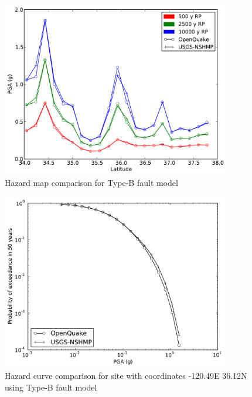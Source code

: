 \begin{figure}
\centering
\includegraphics[width=10cm]{./qareport/pictures/oq_nshmp_bFault_ar1.pdf}
\caption{Hazard map comparison for Type-B fault model}
\label{fig:type_b_map}
\end{figure}
\begin{figure}
\centering
\includegraphics[width=10cm]{./qareport/pictures/-120pt49_36pt12_bFault_ar1.pdf}
\caption{Hazard curve comparison for site with coordinates -120.49E 36.12N using Type-B fault model}
\label{fig:type_b_curve}
\end{figure}

